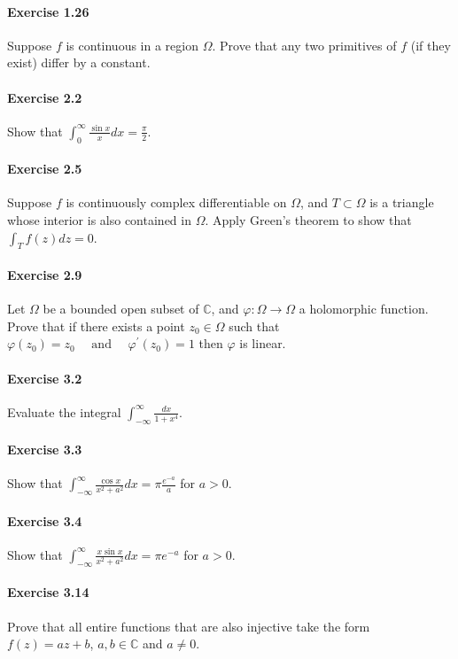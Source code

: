 \documentclass{article}
\begin{document}
\paragraph{Exercise 1.26} Suppose $f$ is continuous in a region $\Omega$. Prove that any two primitives of $f$ (if they exist) differ by a constant.

\paragraph{Exercise 2.2} Show that $\int_{0}^{\infty} \frac{\sin x}{x} d x=\frac{\pi}{2}$.

\paragraph{Exercise 2.5} Suppose $f$ is continuously complex differentiable on $\Omega$, and $T \subset \Omega$ is a triangle whose interior is also contained in $\Omega$.  Apply Green’s theorem to show that $\int_T f(z) dz = 0$.

\paragraph{Exercise 2.9} Let $\Omega$ be a bounded open subset of $\mathbb{C}$, and $\varphi: \Omega \rightarrow \Omega$ a holomorphic function. Prove that if there exists a point $z_{0} \in \Omega$ such that $\varphi\left(z_{0}\right)=z_{0} \quad \text { and } \quad \varphi^{\prime}\left(z_{0}\right)=1$ then $\varphi$ is linear.

\paragraph{Exercise 3.2} Evaluate the integral $\int_{-\infty}^{\infty} \frac{dx}{1 + x^4}$.

\paragraph{Exercise 3.3} Show that $ \int_{-\infty}^{\infty} \frac{\cos x}{x^2 + a^2} dx = \pi \frac{e^{-a}}{a}$ for $a > 0$.

\paragraph{Exercise 3.4} Show that $ \int_{-\infty}^{\infty} \frac{x \sin x}{x^2 + a^2} dx = \pi e^{-a}$ for $a > 0$.

\paragraph{Exercise 3.14} Prove that all entire functions that are also injective take the form $f(z) = az + b$, $a, b \in \mathbb{C}$ and $a \neq 0$.
\end{document}
